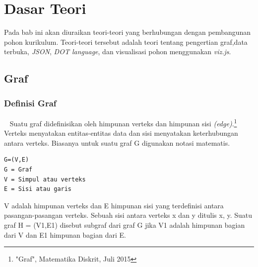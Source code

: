 
\chapter{Dasar Teori}
\label{chap:Dasar Teori}
Pada bab ini akan diuraikan teori-teori yang berhubungan dengan pembangunan pohon kurikulum. Teori-teori tersebut adalah teori tentang pengertian graf,data terbuka, \textit{JSON}, \textit{DOT language}, dan visualisasi pohon menggunakan \textit{viz.js}.

\section{Graf}
\label{sec: Graf}

\subsection{Definisi Graf}
\label{sec: Definisi Graf}
~\cite{munir:02:graf}
Suatu graf didefinisikan oleh himpunan verteks dan himpunan sisi \textit{(edge)}.\footnote{"Graf", Matematika Diskrit, Juli 2015}
Verteks menyatakan entitas-entitas data dan sisi menyatakan keterhubungan antara
verteks. Biasanya untuk suatu graf G digunakan notasi matematis. 
\begin{lstlisting}
G=(V,E)
G = Graf
V = Simpul atau verteks
E = Sisi atau garis
\end{lstlisting}

V adalah himpunan verteks dan E himpunan sisi yang terdefinisi antara pasangan-pasangan verteks. Sebuah sisi antara verteks x dan y ditulis {x, y}. Suatu graf H = (V1,E1) disebut subgraf dari graf G jika V1 adalah himpunan bagian dari V dan E1 himpunan bagian dari E.
